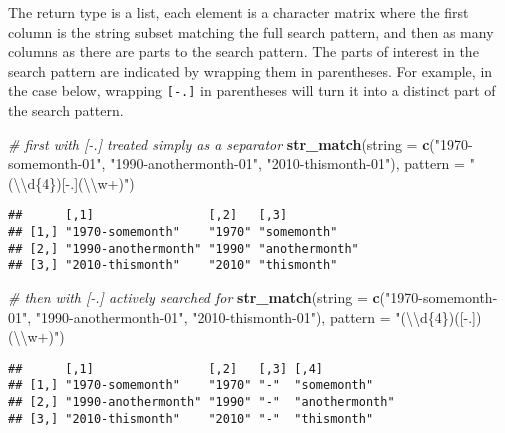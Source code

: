 \documentclass[
]{book}
\newenvironment{Shaded}{}{}
\newcommand{\CharTok}[1]{\textcolor[rgb]{0.25,0.44,0.63}{#1}}
\newcommand{\CommentTok}[1]{\textcolor[rgb]{0.38,0.63,0.69}{\textit{#1}}}
\newcommand{\DataTypeTok}[1]{\textcolor[rgb]{0.56,0.13,0.00}{#1}}
\newcommand{\KeywordTok}[1]{\textcolor[rgb]{0.00,0.44,0.13}{\textbf{#1}}}
\newcommand{\NormalTok}[1]{#1}
\newcommand{\StringTok}[1]{\textcolor[rgb]{0.25,0.44,0.63}{#1}}
\begin{document}
The return type is a list, each element is a character matrix where the first column is the string subset matching the full search pattern, and then as many columns as there are parts to the search pattern. The parts of interest in the search pattern are indicated by wrapping them in parentheses. For example, in the case below, wrapping \texttt{{[}-.{]}} in parentheses will turn it into a distinct part of the search pattern.

\begin{Shaded}
\begin{Highlighting}[]
\CommentTok{# first with [-.] treated simply as a separator}
\KeywordTok{str_match}\NormalTok{(}\DataTypeTok{string =} \KeywordTok{c}\NormalTok{(}\StringTok{"1970-somemonth-01"}\NormalTok{,}
                     \StringTok{"1990-anothermonth-01"}\NormalTok{,}
                     \StringTok{"2010-thismonth-01"}\NormalTok{),}
          \DataTypeTok{pattern =} \StringTok{"(}\CharTok{\textbackslash{}\textbackslash{}}\StringTok{d\{4\})[-.](}\CharTok{\textbackslash{}\textbackslash{}}\StringTok{w+)"}\NormalTok{)}
\end{Highlighting}
\end{Shaded}

\begin{verbatim}
##      [,1]                [,2]   [,3]          
## [1,] "1970-somemonth"    "1970" "somemonth"   
## [2,] "1990-anothermonth" "1990" "anothermonth"
## [3,] "2010-thismonth"    "2010" "thismonth"
\end{verbatim}

\begin{Shaded}
\begin{Highlighting}[]
\CommentTok{# then with [-.] actively searched for}
\KeywordTok{str_match}\NormalTok{(}\DataTypeTok{string =} \KeywordTok{c}\NormalTok{(}\StringTok{"1970-somemonth-01"}\NormalTok{,}
                     \StringTok{"1990-anothermonth-01"}\NormalTok{,}
                     \StringTok{"2010-thismonth-01"}\NormalTok{),}
          \DataTypeTok{pattern =} \StringTok{"(}\CharTok{\textbackslash{}\textbackslash{}}\StringTok{d\{4\})([-.])(}\CharTok{\textbackslash{}\textbackslash{}}\StringTok{w+)"}\NormalTok{)}
\end{Highlighting}
\end{Shaded}

\begin{verbatim}
##      [,1]                [,2]   [,3] [,4]          
## [1,] "1970-somemonth"    "1970" "-"  "somemonth"   
## [2,] "1990-anothermonth" "1990" "-"  "anothermonth"
## [3,] "2010-thismonth"    "2010" "-"  "thismonth"
\end{verbatim}
\end{document}

